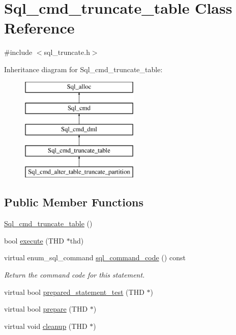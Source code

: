 \hypertarget{classSql__cmd__truncate__table}{}\section{Sql\+\_\+cmd\+\_\+truncate\+\_\+table Class Reference}
\label{classSql__cmd__truncate__table}


{\ttfamily \#include $<$sql\+\_\+truncate.\+h$>$}

Inheritance diagram for Sql\+\_\+cmd\+\_\+truncate\+\_\+table\+:\begin{figure}[H]
\begin{center}
\leavevmode
\includegraphics[height=5.000000cm]{classSql__cmd__truncate__table}
\end{center}
\end{figure}
\subsection*{Public Member Functions}
\begin{DoxyCompactItemize}
\item 
\mbox{\hyperlink{classSql__cmd__truncate__table_af23ab87bb9de25769dc89a30361855dd}{Sql\+\_\+cmd\+\_\+truncate\+\_\+table}} ()
\item 
bool \mbox{\hyperlink{classSql__cmd__truncate__table_ab47847ea764e186a542fb8fc834cdad2}{execute}} (T\+HD $\ast$thd)
\item 
\mbox{\label{classSql__cmd__truncate__table_aca6777bbd0f23725cb4102c5fd7d43fd}} 
virtual enum\+\_\+sql\+\_\+command \mbox{\hyperlink{classSql__cmd__truncate__table_aca6777bbd0f23725cb4102c5fd7d43fd}{sql\+\_\+command\+\_\+code}} () const
\begin{DoxyCompactList}\small\item\em Return the command code for this statement. \end{DoxyCompactList}\item 
virtual bool \mbox{\hyperlink{classSql__cmd__truncate__table_acad0a1ad1b5137184b19d333abc3b1ba}{prepared\+\_\+statement\+\_\+test}} (T\+HD $\ast$)
\item 
virtual bool \mbox{\hyperlink{classSql__cmd__truncate__table_a330e8a3864e8646a4ac4053c8a93db6d}{prepare}} (T\+HD $\ast$)
\item 
virtual void \mbox{\hyperlink{classSql__cmd__truncate__table_aef61dc712f14dc3f3c0a343806f5de54}{cleanup}} (T\+HD $\ast$)
\end{DoxyCompactItemize}

